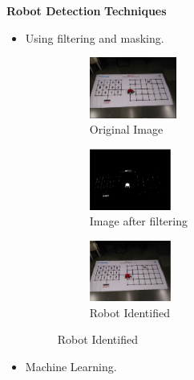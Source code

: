 \documentclass[10pt, a4paper]{beamer}
\begin{document}
\begin{frame}
	\textbf{Robot Detection}
	\textbf{Techniques}
	\begin{itemize}
		\item {Using filtering and masking.}
			\begin{figure}[h!]
				\begin{subfigure}{0.4\textwidth}
					\includegraphics[width=0.6\linewidth, height=2cm]{Filtering/objectdetection/1.jpg}
					\caption{Original Image}
				\end{subfigure}
				\begin{subfigure}{0.4\textwidth}
					\includegraphics[width=0.6\linewidth, height=2cm]{Filtering/objectdetection/2.jpg}
					\caption{Image after filtering}
				\end{subfigure}
				\begin{subfigure}{0.4\textwidth}
					\includegraphics[width=0.6\linewidth, height=2cm]{Filtering/objectdetection/3.jpg} 
					\caption{Robot Identified}
				\end{subfigure}
			\end{figure}
		\item {Machine Learning.}
	\end{itemize}	
\end{frame}
\end{document}
